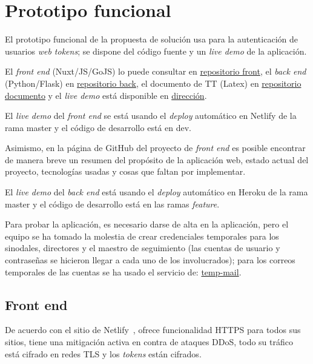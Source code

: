 \section{Prototipo funcional}

El prototipo funcional de la propuesta de solución usa para la autenticación de usuarios \textit{web tokens}; se dispone del código fuente y un \textit{live demo} de la aplicación.


El \textit{front end} (Nuxt/JS/GoJS) lo puede consultar en \href{https://github.com/martinez-acosta/TT-2019-B052}{repositorio front}, el \textit{back end} (Python/Flask) en \href{https://github.com/omaraparicio07/api-tt-2019-b052}{repositorio back}, el documento de TT (Latex) en \href{https://github.com/martinez-acosta/DOCS-TT-2019-B052}{repositorio documento} y el \textit{live demo} está disponible en \href{https://serene-haibt-2239b4.netlify.app/}{dirección}.


El \textit{live demo} del \textit{front end} se está usando el \textit{deploy} automático en Netlify de la rama master y el código de desarrollo está en dev. 


Asimismo, en la página de GitHub del proyecto de \textit{front end} es posible encontrar de manera breve un resumen del propósito de la aplicación web, estado actual del proyecto, tecnologías usadas y cosas que faltan por implementar.


El \textit{live demo} del \textit{back end} está usando el \textit{deploy} automático en Heroku de la rama master y el código de desarrollo está en las ramas \textit{feature}.


Para probar la aplicación, es necesario darse de alta en la aplicación, pero el equipo se ha tomado la molestia de crear credenciales temporales para los sinodales, directores y el maestro de seguimiento (las cuentas de usuario y contraseñas se hicieron llegar a cada uno de los involucrados); para los correos temporales de las cuentas se ha usado el servicio de: \href{https://temp-mail.org/es/}{temp-mail}.

\subsection*{Front end}

De acuerdo con el sitio de Netlify~\cite{netlify_netlify_nodate}, ofrece funcionalidad HTTPS para todos sus sitios, tiene una mitigación activa en contra de ataques DDoS, todo su tráfico está cifrado en redes TLS y los \textit{tokens} están cifrados.

